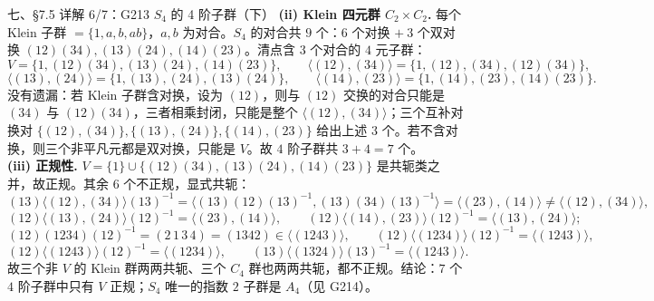 \documentclass[aspectratio=169,10pt,fontset=none]{ctexbeamer}
\newcommand{\key}[1]{\textcolor{ink}{\bfseries #1}}
\begin{document}
\begin{frame}[t]{七、\S7.5 详解 6/7：G213 $S_4$ 的 4 阶子群（下）}
\scriptsize
\setlength{\parskip}{1pt}
\key{(ii) Klein 四元群 $C_2\times C_2$.} 每个 Klein 子群 $=\{1,a,b,ab\}$，$a,b$ 为对合。$S_4$ 的对合共 $9$ 个：$6$ 个对换 $+\ 3$ 个双对换 $(12)(34),(13)(24),(14)(23)$。清点含 $3$ 个对合的 $4$ 元子群：
\[
V=\{1,(12)(34),(13)(24),(14)(23)\},\qquad
\langle(12),(34)\rangle=\{1,(12),(34),(12)(34)\},
\]
\[
\langle(13),(24)\rangle=\{1,(13),(24),(13)(24)\},\qquad
\langle(14),(23)\rangle=\{1,(14),(23),(14)(23)\}.
\]
没有遗漏：若 Klein 子群含对换，设为 $(12)$，则与 $(12)$ 交换的对合只能是 $(34)$ 与 $(12)(34)$，三者相乘封闭，只能是整个 $\langle(12),(34)\rangle$；三个互补对换对 $\{(12),(34)\},\{(13),(24)\},\{(14),(23)\}$ 给出上述 $3$ 个。若不含对换，则三个非平凡元都是双对换，只能是 $V$。故 $4$ 阶子群共 $3+4=7$ 个。\\
\key{(iii) 正规性.} $V=\{1\}\cup\{(12)(34),(13)(24),(14)(23)\}$ 是共轭类之并，故正规。其余 $6$ 个不正规，显式共轭：
\[ (13)\langle(12),(34)\rangle(13)^{-1}=\bigl\langle(13)(12)(13)^{-1},(13)(34)(13)^{-1}\bigr\rangle=\langle(23),(14)\rangle\ne\langle(12),(34)\rangle, \]
\[ (12)\langle(13),(24)\rangle(12)^{-1}=\langle(23),(14)\rangle,\qquad (12)\langle(14),(23)\rangle(12)^{-1}=\langle(13),(24)\rangle; \]
\[ (12)(1234)(12)^{-1}=(2\,1\,3\,4)=(1342)\in\langle(1243)\rangle,\qquad (12)\langle(1234)\rangle(12)^{-1}=\langle(1243)\rangle, \]
\[ (12)\langle(1243)\rangle(12)^{-1}=\langle(1234)\rangle,\qquad (13)\langle(1324)\rangle(13)^{-1}=\langle(1243)\rangle. \]
故三个非 $V$ 的 Klein 群两两共轭、三个 $C_4$ 群也两两共轭，都不正规。结论：$7$ 个 $4$ 阶子群中只有 $V$ 正规；$S_4$ 唯一的指数 $2$ 子群是 $A_4$（见 G214）。
\end{frame}
\end{document}
